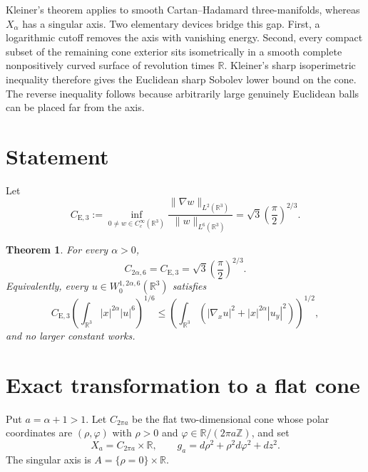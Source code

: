 \documentclass[11pt]{article}
\newtheorem{theorem}{Theorem}
\newcommand{\R}{\mathbb R}
\begin{document}
Kleiner's theorem applies to smooth Cartan--Hadamard three-manifolds, whereas
$X_\alpha$ has a singular axis.  Two elementary devices bridge this gap.
First, a logarithmic cutoff removes the axis with vanishing energy.  Second,
every compact subset of the remaining cone exterior sits isometrically in a
smooth complete nonpositively curved surface of revolution times $\R$.
Kleiner's sharp isoperimetric inequality therefore gives the Euclidean sharp
Sobolev lower bound on the cone.  The reverse inequality follows because
arbitrarily large genuinely Euclidean balls can be placed far from the axis.

\section*{Statement}

Let
\[
 C_{\mathrm E,3}
 :=\inf_{0\ne w\in C_c^\infty(\R^3)}
 \frac{\|\nabla w\|_{L^2(\R^3)}}{\|w\|_{L^6(\R^3)}}
 =\sqrt3\left(\frac{\pi}{2}\right)^{2/3}.
\]

\begin{theorem}\label{thm:main}
For every $\alpha>0$,
\[
 C_{2\alpha,6}=C_{\mathrm E,3}
 =\sqrt3\left(\frac{\pi}{2}\right)^{2/3}.
\]
Equivalently, every $u\in W^{1,2\alpha,6}_0(\R^3)$ satisfies
\[
 C_{\mathrm E,3}
 \left(\int_{\R^3}|x|^{2\alpha}|u|^6\right)^{1/6}
 \le
 \left(\int_{\R^3}
 (|\nabla_xu|^2+|x|^{2\alpha}|u_y|^2)\right)^{1/2},
\]
and no larger constant works.
\end{theorem}

\section*{Exact transformation to a flat cone}

Put $a=\alpha+1>1$.  Let $C_{2\pi a}$ be the flat two-dimensional cone
whose polar coordinates are $(\rho,\varphi)$ with
$\rho>0$ and $\varphi\in\R/(2\pi a\mathbb Z)$, and set
\[
 X_a=C_{2\pi a}\times\R,
 \qquad
 g_a=d\rho^2+\rho^2d\varphi^2+dz^2.
\]
The singular axis is $A=\{\rho=0\}\times\R$.
\end{document}

